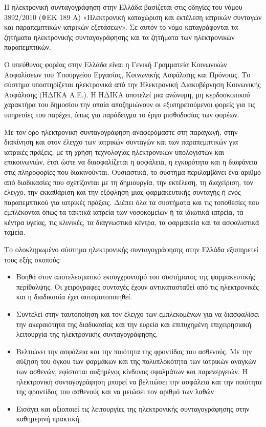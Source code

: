 		Η ηλεκτρονική συνταγογράφηση στην Ελλάδα βασίζεται στις οδηγίες του νόμου 3892/2010 (ΦΕΚ 189 Α) «Ηλεκτρονική καταχώριση και εκτέλεση ιατρικών συνταγών και παραπεμπτικών ιατρικών εξετάσεων». Σε αυτόν το νόμο καταγράφονται τα ζητήματα ηλεκτρονικής συνταγογράφησης και τα ζητήματα των ηλεκτρονικών παραπεμπτικών.
		
		Ο υπεύθυνος φορέας στην Ελλάδα είναι η Γενική Γραμματεία Κοινωνικών Ασφαλίσεων του Υπουργείου Εργασίας, Κοινωνικής Ασφάλισης και Πρόνοιας. Το σύστημα υποστηρίζεται ηλεκτρονικά από την Ηλεκτρονική Διακυβέρνηση Κοινωνικής Ασφάλισης (ΗΔΙΚΑ Α.Ε.). Η ΗΔΙΚΑ αποτελεί μια ανώνυμη, μη κερδοσκοπικού χαρακτήρα του δημοσίου την οποία αποζημιώνουν οι εξυπηρετούμενοι φορείς για τις υπηρεσίες του παρέχει, όπως για παράδειγμα το έργο μισθοδοσίας των φορέων.  \cite{idika}
		
		Με τον όρο ηλεκτρονική συνταγογράφηση αναφερόμαστε στη παραγωγή, στην διακίνηση και στον έλεγχο των ιατρικών συνταγών και των παραπεμπτικών για ιατρικές πράξεις, με τη χρήση τεχνολογίας ηλεκτρονικών υπολογιστών και επικοινωνιών, έτσι ώστε να διασφαλίζεται η ασφάλεια, η εγκυρότητα και η διαφάνεια στις πληροφορίες που διακινούνται. Ουσιαστικά, το σύστημα περιλαμβάνει ένα αριθμό από διαδικασίες που σχετίζονται με τη δημιουργία, την εκτέλεση, τη διαχείριση, τον έλεγχο, την εκκαθάριση και την εξόφληση μιας φαρμακευτικής συνταγής ή ενός παραπεμπτικού για ιατρικές πράξεις. Διέπει όλα τα συστήματα και τις τοποθεσίες που εμπλέκονται όπως τα τακτικά ιατρεία των νοσοκομείων ή τα ιδιωτικά ιατρεία, τα κέντρα υγείας, τις κλινικές, τα διαγνωστικά κέντρα, τα φαρμακεία και τα ασφαλιστικά ταμεία.


		
		Το ολοκληρωμένο σύστημα ηλεκτρονικής συνταγογράφησης στην Ελλάδα εξυπηρετεί τους εξής σκοπούς:
		
		\begin{itemize}

		\item  Βοηθά στον αποτελεσματικό εκσυγχρονισμό του συστήματος της φαρμακευτικής περίθαλψης. Οι χειρόγραφες συνταγές έχουν αντικατασταθεί από τις ηλεκτρονικές και η διαδικασία έχει αυτοματοποιηθεί.
		 
		\item Συντελεί στην ταυτοποίηση και τον έλεγχο των εμπλεκομένων για να διασφαλίσει την ακεραιότητα της διαδικασίας και την ευρεία και επιτυχημένη επιχειρησιακή λειτουργία της ηλεκτρονικής συνταγογράφησης.
		
		\item Βελτιώνει την ασφάλεια και την ποιότητα της φροντίδας του ασθενούς. Με την αύξηση του όγκου των φαρμάκων και της πολυπλοκότητα των ιατρικών αναγκών των ασθενών, εφίσταται αυξημένος κίνδυνος σφαλμάτων και παρενεργειών. Η ηλεκτρονική συνταγογράφηση μπορεί να βελτιώσει την ασφάλεια και την ποιότητα της φροντίδας του ασθενούς και να μειώσει τον αριθμό των λαθών
		
		\item Εισάγει και αξιοποιεί τις λειτουργίες της ηλεκτρονικής συνταγογράφησης στην καθημερινή πρακτική.

		\end{itemize}

